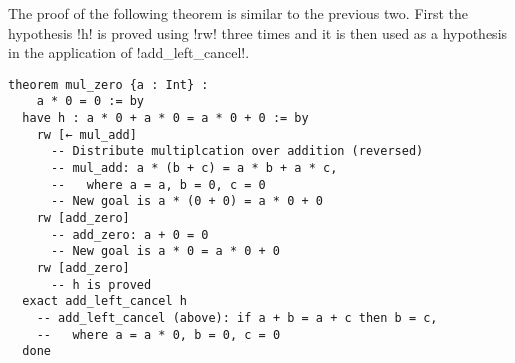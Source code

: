 
The proof of the following theorem is similar to the previous two. First the hypothesis !h! is proved using !rw! three times and it is then used as a hypothesis in the application of !add_left_cancel!.
\begin{Verbatim}[firstnumber=last]
theorem mul_zero {a : Int} :
    a * 0 = 0 := by
  have h : a * 0 + a * 0 = a * 0 + 0 := by
    rw [← mul_add]
      -- Distribute multiplcation over addition (reversed)
      -- mul_add: a * (b + c) = a * b + a * c,
      --   where a = a, b = 0, c = 0
      -- New goal is a * (0 + 0) = a * 0 + 0
    rw [add_zero]
      -- add_zero: a + 0 = 0
      -- New goal is a * 0 = a * 0 + 0
    rw [add_zero]
      -- h is proved
  exact add_left_cancel h
    -- add_left_cancel (above): if a + b = a + c then b = c,
    --   where a = a * 0, b = 0, c = 0
  done
\end{Verbatim}
